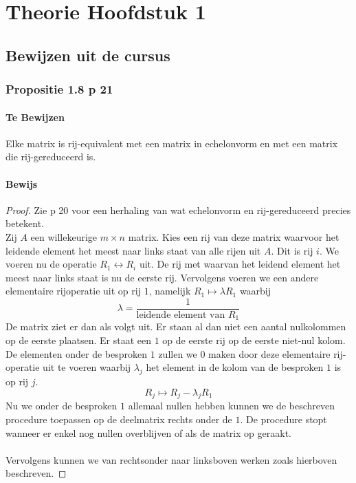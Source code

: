 \documentclass[lineaire_algebra_oplossingen.tex]{subfiles}
\begin{document}
\chapter{Theorie Hoofdstuk 1}

\section{Bewijzen uit de cursus}
\subsection{Propositie 1.8 p 21}
\subsubsection*{Te Bewijzen}
Elke matrix is rij-equivalent met een matrix in echelonvorm en met een matrix die rij-gereduceerd is.
\subsubsection*{Bewijs}
\begin{proof}
Zie p 20 voor een herhaling van wat echelonvorm en rij-gereduceerd precies betekent.\\
Zij $A$ een willekeurige $m\times n$ matrix. Kies een rij van deze matrix waarvoor het leidende element het meest naar links staat van alle rijen uit $A$. Dit is rij $i$. We voeren nu de operatie $R_1 \leftrightarrow R_i$ uit. De rij met waarvan het leidend element het meest naar links staat is nu de eerste rij. Vervolgens voeren we een andere elementaire rijoperatie uit op rij $1$, namelijk $R_1\longmapsto \lambda R_1$ waarbij 
\[
\lambda = \frac{1}{\text{leidende element van } R_1}
\]
De matrix ziet er dan als volgt uit. Er staan al dan niet een aantal nulkolommen op de eerste plaatsen. Er staat een $1$ op de eerste rij op de eerste niet-nul kolom.
De elementen onder de besproken $1$ zullen we $0$ maken door deze elementaire rij-operatie uit te voeren waarbij $\lambda_j$ het element in de kolom van de besproken $1$ is op rij $j$.
\[
R_j \longmapsto R_j - \lambda_jR_1
\]
Nu we onder de besproken $1$ allemaal nullen hebben kunnen we de beschreven procedure toepassen op de deelmatrix rechts onder de $1$. De procedure stopt wanneer er enkel nog nullen overblijven of als de matrix op geraakt.\\\\
Vervolgens kunnen we van rechtsonder naar linksboven werken zoals hierboven beschreven.
\end{proof}
\end{document}
